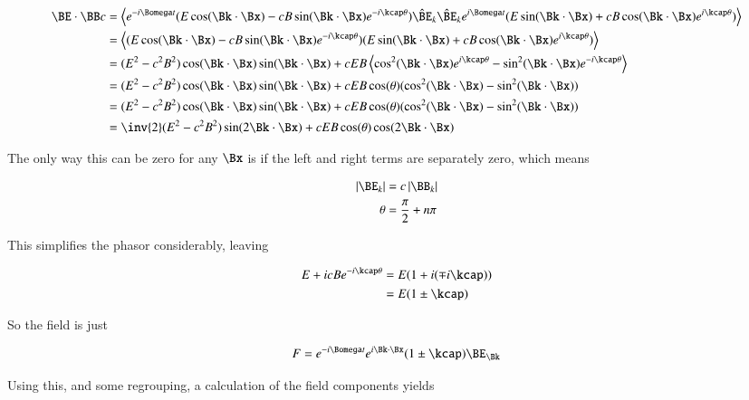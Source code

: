 \begin{align*}
\BE \cdot \BB c
&=
\left\langle{
e^{-i\Bomega t} (E \cos(\Bk \cdot \Bx) - c B \sin(\Bk \cdot \Bx) e^{-i \kcap\theta}) \hat{\BE}_k
\hat{\BE}_k
e^{i\Bomega t} (E \sin(\Bk \cdot \Bx) + c B \cos(\Bk \cdot \Bx) e^{i \kcap\theta})
}\right\rangle \\
&=
\left\langle{
(E \cos(\Bk \cdot \Bx) - c B \sin(\Bk \cdot \Bx) e^{-i \kcap\theta})
(E \sin(\Bk \cdot \Bx) + c B \cos(\Bk \cdot \Bx) e^{i \kcap\theta})
}\right\rangle \\
&=
(E^2 - c^2 B^2) \cos(\Bk \cdot \Bx) \sin(\Bk \cdot \Bx)
+ c E B
\left\langle{
\cos^2(\Bk \cdot \Bx) e^{i \kcap \theta}
-\sin^2(\Bk \cdot \Bx) e^{-i \kcap \theta}
}\right\rangle \\
&=
(E^2 - c^2 B^2) \cos(\Bk \cdot \Bx) \sin(\Bk \cdot \Bx)
+ c E B \cos(\theta) ( \cos^2(\Bk \cdot \Bx) -\sin^2(\Bk \cdot \Bx) ) \\
&=
(E^2 - c^2 B^2) \cos(\Bk \cdot \Bx) \sin(\Bk \cdot \Bx)
+ c E B \cos(\theta) ( \cos^2(\Bk \cdot \Bx) -\sin^2(\Bk \cdot \Bx) ) \\
&=
\inv{2} (E^2 - c^2 B^2) \sin(2 \Bk \cdot \Bx)
+ c E B \cos(\theta) \cos(2 \Bk \cdot \Bx) \\
\end{align*}

The only way this can be zero for any $\Bx$ is if the left and right terms are separately zero, which means

\begin{align*}
\Abs{\BE_k} &= c \Abs{\BB_k} \\
\theta &= \frac{\pi}{2} + n \pi
\end{align*}

This simplifies the phasor considerably, leaving

\begin{align*}
E + i c B e^{-i\kcap \theta}
&=
E(1 + i (\mp i\kcap )) \\
&=
E(1 \pm \kcap)
\end{align*}

So the field is just

\begin{align}
F = e^{-i \Bomega t} e^{i \Bk \cdot \Bx} (1 \pm \kcap) \BE_\Bk
\end{align}

Using this, and some regrouping, a calculation of the field components yields


